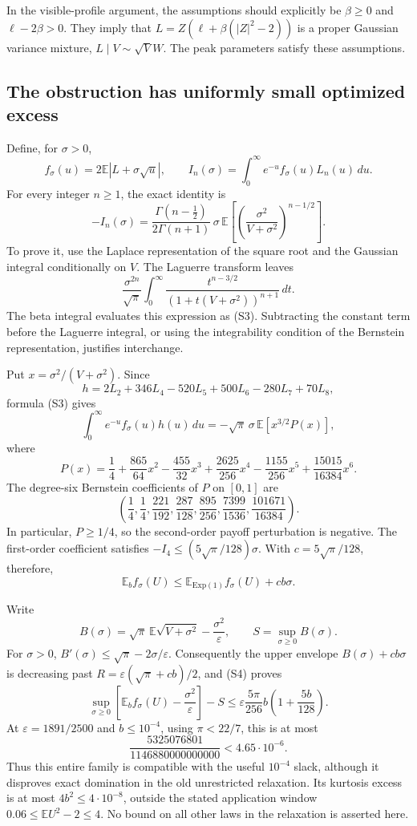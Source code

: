 In the visible-profile argument, the assumptions should explicitly be
$\beta\ge0$ and $\ell-2\beta>0$. They imply that
$L=Z(\ell+\beta(|Z|^2-2))$ is a proper Gaussian variance mixture,
$L\mid V\sim\sqrt V W$. The peak parameters satisfy these assumptions.

\subsection{The obstruction has uniformly small optimized excess}

Define, for $\sigma>0$,
\[
 f_\sigma(u)=2\mathbb E|L+\sigma\sqrt u|,
 \qquad I_n(\sigma)=\int_0^\infty e^{-u}f_\sigma(u)L_n(u)\,du.
\]
For every integer $n\ge1$, the exact identity is
\[
 \boxed{-I_n(\sigma)=
 \frac{\Gamma(n-\tfrac12)}{2\Gamma(n+1)}\,
 \sigma\,\mathbb E\left[
 \left(\frac{\sigma^2}{V+\sigma^2}\right)^{n-1/2}\right].}
 \tag{S3}
\]
To prove it, use the Laplace representation of the square root and the
Gaussian integral conditionally on $V$. The Laguerre transform leaves
\[
 \frac{\sigma^{2n}}{\sqrt\pi}
 \int_0^\infty\frac{t^{n-3/2}}{(1+t(V+\sigma^2))^{n+1}}\,dt.
\]
The beta integral evaluates this expression as (S3). Subtracting the
constant term before the Laguerre integral, or using the integrability
condition of the Bernstein representation, justifies interchange.

Put $x=\sigma^2/(V+\sigma^2)$. Since
\[
 h=2L_2+346L_4-520L_5+500L_6-280L_7+70L_8,
\]
formula (S3) gives
\[
 \int_0^\infty e^{-u}f_\sigma(u)h(u)\,du
 =-\sqrt\pi\,\sigma\,\mathbb E[x^{3/2}P(x)],
\]
where
\[
 P(x)=\frac14+\frac{865}{64}x^2-\frac{455}{32}x^3
 +\frac{2625}{256}x^4-\frac{1155}{256}x^5
 +\frac{15015}{16384}x^6.
\]
The degree-six Bernstein coefficients of $P$ on $[0,1]$ are
\[
 \left(\frac14,\frac14,\frac{221}{192},\frac{287}{128},
 \frac{895}{256},\frac{7399}{1536},\frac{101671}{16384}\right).
\]
In particular, $P\ge1/4$, so the second-order payoff perturbation is
negative. The first-order coefficient satisfies
$-I_4\le(5\sqrt\pi/128)\sigma$. With $c=5\sqrt\pi/128$, therefore,
\[
 \mathbb E_b f_\sigma(U)
 \le\mathbb E_{\mathrm{Exp}(1)}f_\sigma(U)+cb\sigma.
 \tag{S4}
\]

Write
\[
 B(\sigma)=\sqrt\pi\,\mathbb E\sqrt{V+\sigma^2}
             -\frac{\sigma^2}{\varepsilon},\qquad
 S=\sup_{\sigma\ge0}B(\sigma).
\]
For $\sigma>0$,
$B'(\sigma)\le\sqrt\pi-2\sigma/\varepsilon$. Consequently the upper
envelope $B(\sigma)+cb\sigma$ is decreasing past
$R=\varepsilon(\sqrt\pi+cb)/2$, and (S4) proves
\[
 \boxed{\sup_{\sigma\ge0}
 \left[\mathbb E_b f_\sigma(U)-\frac{\sigma^2}{\varepsilon}\right]-S
 \le\varepsilon\frac{5\pi}{256}b\left(1+\frac{5b}{128}\right).}
 \tag{S5}
\]
At $\varepsilon=1891/2500$ and $b\le10^{-4}$, using $\pi<22/7$, this is at most
\[
 \frac{5325076801}{1146880000000000}<4.65\cdot10^{-6}.
\]
Thus this entire family is compatible with the useful $10^{-4}$ slack,
although it disproves exact domination in the old unrestricted relaxation.
Its kurtosis excess is at most $4b^2\le4\cdot10^{-8}$, outside the stated
application window $0.06\le\mathbb E U^2-2\le4$.
No bound on all other laws in the relaxation is asserted here.

